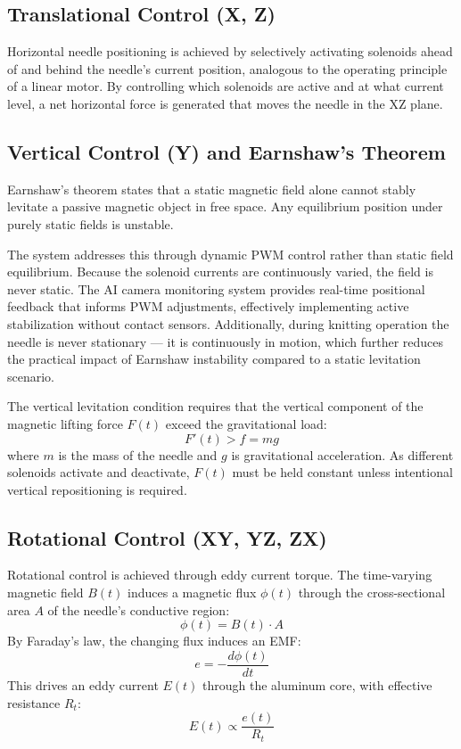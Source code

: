 \documentclass[10pt]{article}
\begin{document}
\subsection{Translational Control (X, Z)}
Horizontal needle positioning is achieved by selectively activating solenoids ahead of and behind the needle's current position, analogous to the operating principle of a linear motor. By controlling which solenoids are active and at what current level, a net horizontal force is generated that moves the needle in the XZ plane.

\subsection{Vertical Control (Y) and Earnshaw's Theorem}
Earnshaw's theorem states that a static magnetic field alone cannot stably levitate a passive magnetic object in free space. Any equilibrium position under purely static fields is unstable.

The system addresses this through dynamic PWM control rather than static field equilibrium. Because the solenoid currents are continuously varied, the field is never static. The AI camera monitoring system provides real-time positional feedback that informs PWM adjustments, effectively implementing active stabilization without contact sensors. Additionally, during knitting operation the needle is never stationary --- it is continuously in motion, which further reduces the practical impact of Earnshaw instability compared to a static levitation scenario.

The vertical levitation condition requires that the vertical component of the magnetic lifting force $F(t)$ exceed the gravitational load:
\begin{equation}
F'(t)>f=mg
\tag{1}
\end{equation}
where $m$ is the mass of the needle and $g$ is gravitational acceleration. As different solenoids activate and deactivate, $F(t)$ must be held constant unless intentional vertical repositioning is required.

\subsection{Rotational Control (XY, YZ, ZX)}
Rotational control is achieved through eddy current torque. The time-varying magnetic field $B(t)$ induces a magnetic flux $\phi(t)$ through the cross-sectional area $A$ of the needle's conductive region:
\begin{equation}
\phi(t)=B(t)\cdot A
\tag{2}
\end{equation}
By Faraday's law, the changing flux induces an EMF:
\begin{equation}
e=-\frac{d\phi(t)}{dt}
\tag{3}
\end{equation}
This drives an eddy current $E(t)$ through the aluminum core, with effective resistance $R_t$:
\begin{equation}
E(t)\propto\frac{e(t)}{R_t}
\tag{4}
\end{equation}
\end{document}
